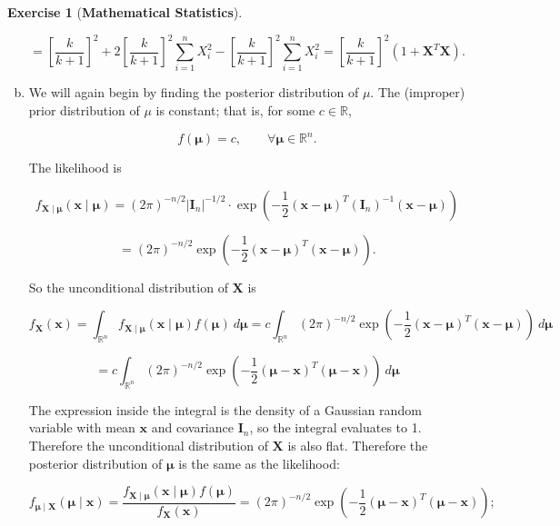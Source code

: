 \documentclass{article}
\theoremstyle{definition}
\newtheorem{exercise}{Exercise}
\theoremstyle{definition}
\theoremstyle{definition}
\theoremstyle{definition}
\theoremstyle{definition}
\begin{document}
\begin{exercise}[\textbf{Mathematical Statistics}]
\begin{enumerate}[(a)]
\[
= \left[ \frac{k}{k+1} \right]^2   + 2 \left[ \frac{k}{k+1}\right]^2    \sum_{i=1}^n  X_i ^2  - \left[ \frac{k}{k+1} \right]^2 \sum_{i=1}^n X_i^2 = \left[ \frac{k}{k+1} \right]^2 \left(1   +     \boldsymbol{X}^T \boldsymbol{X} \right).  
\] 


\item We will again begin by finding the posterior distribution of \(\mu\). The (improper) prior distribution of \(\mu\) is constant; that is, for some \(c\in \mathbb{R}\),

\[
f(\boldsymbol{\mu}) = c, \qquad \forall \boldsymbol{\mu} \in \mathbb{R}^n.
\]

The likelihood is

\[
f_{\boldsymbol{X} \mid \boldsymbol{\mu}}(\boldsymbol{x} \mid \boldsymbol{\mu}) = (2 \pi)^{-n/2} | \boldsymbol{I}_n|^{-1/2} \cdot \exp \left(- \frac{1}{2}(\boldsymbol{x} - \boldsymbol{\mu}) ^T ( \boldsymbol{I}_n)^{-1} (\boldsymbol{x} - \boldsymbol{\mu} ) \right)
\]

\[
= (2 \pi)^{-n/2} \exp \left(- \frac{1}{2}(\boldsymbol{x} - \boldsymbol{\mu}) ^T  (\boldsymbol{x} - \boldsymbol{\mu} ) \right).
\]

So the unconditional distribution of \(\boldsymbol{X}\) is

\[
f_{\boldsymbol{X}}(\boldsymbol{x})  = \int_{\mathbb{R}^n} f_{\boldsymbol{X} \mid \boldsymbol{\mu}}(\boldsymbol{x} \mid \boldsymbol{\mu}) f(\boldsymbol{\mu}) \ d \boldsymbol{\mu} = c \int_{\mathbb{R}^n}  (2 \pi)^{-n/2} \exp \left(- \frac{1}{2}(\boldsymbol{x} - \boldsymbol{\mu}) ^T  (\boldsymbol{x} - \boldsymbol{\mu} ) \right)  \ d \boldsymbol{\mu}
\]

\[
= c \int_{\mathbb{R}^n}  (2 \pi)^{-n/2} \exp \left(- \frac{1}{2}(  \boldsymbol{\mu} - \boldsymbol{x}) ^T  (\boldsymbol{\mu} - \boldsymbol{x}) \right)  \ d \boldsymbol{\mu}
\]

The expression inside the integral is the density of a Gaussian random variable with mean \(\boldsymbol{x}\) and covariance \(\boldsymbol{I}_n\), so the integral evaluates to 1. Therefore the unconditional distribution of \(\boldsymbol{X}\) is also flat. Therefore the posterior distribution of \(\boldsymbol{\mu}\) is the same as the likelihood:

\[
f_{\boldsymbol{\mu} \mid \boldsymbol{X}}(\boldsymbol{\mu} \mid \boldsymbol{x}) = \frac{f_{\boldsymbol{X} \mid \boldsymbol{\mu}}(\boldsymbol{x} \mid \boldsymbol{\mu}) f(\boldsymbol{\mu})}{f_{\boldsymbol{X}}(\boldsymbol{x})} = (2 \pi)^{-n/2} \exp \left(- \frac{1}{2}(\boldsymbol{\mu} - \boldsymbol{x} ) ^T  ( \boldsymbol{\mu} - \boldsymbol{x}) \right);
\]


\end{enumerate}
\end{exercise}
\end{document}
